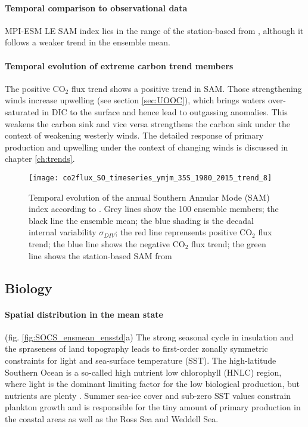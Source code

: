 \documentclass[12pt]{article}
\begin{document}
\paragraph{Temporal comparison to observational data} 
MPI-ESM LE SAM index lies in the range of the station-based from \citep{Marshall2003}, although it follows a weaker trend in the ensemble mean. 

\paragraph{Temporal evolution of extreme carbon trend members}
The positive CO$_2$ flux trend shows a positive trend in SAM. Those strengthening winds increase upwelling (see section \ref{sec:UOOC}), which brings waters over-saturated in DIC to the surface and hence lead to outgassing anomalies. This weakens the carbon sink and vice versa strengthens the carbon sink under the context of weakening westerly winds. The detailed response of primary production and upwelling under the context of changing winds is discussed in chapter \ref{ch:trends}.







\begin{figure}[h!]
	\texttt{[image: co2flux\_SO\_timeseries\_ymjm\_35S\_1980\_2015\_trend\_8]}
	\caption{Temporal evolution of the annual Southern Annular Mode (SAM) index according to \citep{Gong1999}. Grey lines show the 100 ensemble members; the black line the ensemble mean; the blue shading is the decadal internal variability $\sigma_{DIV}$; the red line reprensents positive CO$_2$ flux trend; the blue line shows the negative CO$_2$ flux trend; the green line shows the station-based SAM from \cite{Marshall2003}}
	\label{fig:evolution_SAM}
\end{figure}






\clearpage
\subsection{Biology}
\label{sec:biology}

\paragraph{Spatial distribution in the mean state} %
(fig. \ref{fig:SOCS_ensmean_ensstd}a) 
The strong seasonal cycle in insulation and the spraseness of land topography leads to first-order zonally symmetric constraints for light and sea-surface temperature (SST). The high-latitude Southern Ocean is a so-called high nutrient low chlorophyll (HNLC) region, where light is the dominant limiting factor for the low biological production, but nutrients are plenty \citep{Falkowski1998}. Summer sea-ice cover and sub-zero SST values constrain plankton growth and is responsible for the tiny amount of primary production in the coastal areas as well as the Ross Sea and Weddell Sea. 
\end{document}
